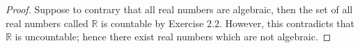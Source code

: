 \begin{Exercise}
	\begin{proof}
		Suppose to contrary that all real numbers are algebraic, then the set of all real numbers called $\mathbb{R}$ is countable by Exercise 2.2.
		However, this contradicts that $\mathbb{R}$ is uncountable; hence there exist real numbers which are not algebraic.
	\end{proof}
\end{Exercise}
